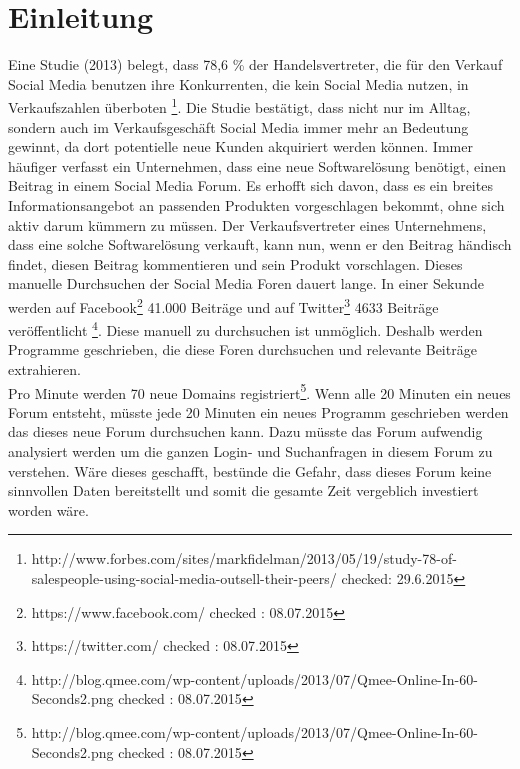 
\section{Einleitung}
Eine Studie (2013) belegt, dass 78,6 \% der Handelsvertreter, die für den Verkauf Social Media benutzen ihre Konkurrenten, die kein Social Media nutzen, in Verkaufszahlen überboten \footnote{http://www.forbes.com/sites/markfidelman/2013/05/19/study-78-of-salespeople-using-social-media-outsell-their-peers/ checked: 29.6.2015}.
Die Studie bestätigt, dass nicht nur im Alltag, sondern auch im Verkaufsgeschäft Social Media immer mehr an Bedeutung gewinnt, da dort potentielle neue Kunden akquiriert werden können. Immer häufiger verfasst ein Unternehmen, dass eine neue Softwarelösung benötigt, einen Beitrag in einem Social Media Forum. Es erhofft sich davon, dass es ein breites Informationsangebot an passenden Produkten vorgeschlagen bekommt, ohne sich aktiv darum kümmern zu müssen. Der Verkaufsvertreter eines Unternehmens, dass eine solche Softwarelösung verkauft, kann nun, wenn er den Beitrag händisch findet, diesen Beitrag kommentieren und sein Produkt vorschlagen. 
Dieses manuelle Durchsuchen der Social Media Foren dauert lange. In einer Sekunde werden auf Facebook\footnote{https://www.facebook.com/ checked : 08.07.2015} 41.000 Beiträge und auf Twitter\footnote{https://twitter.com/ checked : 08.07.2015} 4633 Beiträge veröffentlicht \footnote{http://blog.qmee.com/wp-content/uploads/2013/07/Qmee-Online-In-60-Seconds2.png checked : 08.07.2015}. Diese manuell zu durchsuchen ist unmöglich. Deshalb werden Programme geschrieben, die diese Foren durchsuchen und relevante Beiträge extrahieren. \\ Pro Minute werden 70 neue Domains registriert\footnote{http://blog.qmee.com/wp-content/uploads/2013/07/Qmee-Online-In-60-Seconds2.png checked : 08.07.2015}. Wenn alle 20 Minuten ein neues Forum entsteht, müsste jede 20 Minuten ein neues Programm geschrieben werden das dieses neue Forum durchsuchen kann. Dazu müsste das Forum aufwendig analysiert werden um die ganzen Login- und Suchanfragen in diesem Forum zu verstehen. Wäre dieses geschafft, bestünde die Gefahr, dass dieses Forum keine sinnvollen Daten bereitstellt und somit die gesamte Zeit vergeblich investiert worden wäre.\\
